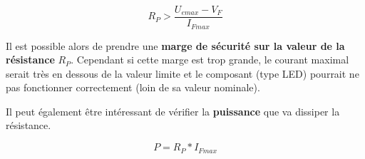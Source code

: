 {\Large
$$\boxed{R_P > \frac{U_{emax} - V_F}{I_{Fmax}}}$$
}

\bigskip

Il est possible alors de prendre une \textbf{marge de sécurité sur la valeur de la résistance} $R_P$. Cependant si cette marge est trop grande, le courant maximal serait très en dessous de la valeur limite et le composant (type LED) pourrait ne pas fonctionner correctement (loin de sa valeur nominale).

\bigskip

Il peut également être intéressant de vérifier la \textbf{puissance} que va dissiper la résistance.

$$P = R_P * I_{Fmax}$$